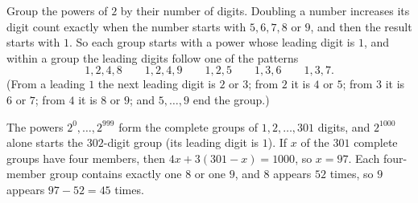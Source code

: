 Group the powers of $2$ by their number of digits. Doubling a number increases its digit count exactly when the number starts with $5,6,7,8$ or $9$, and then the result starts with $1$. So each group starts with a power whose leading digit is $1$, and within a group the leading digits follow one of the patterns
\[1,2,4,8\qquad1,2,4,9\qquad1,2,5\qquad1,3,6\qquad1,3,7.\]
(From a leading $1$ the next leading digit is $2$ or $3$; from $2$ it is $4$ or $5$; from $3$ it is $6$ or $7$; from $4$ it is $8$ or $9$; and $5,\dots,9$ end the group.)

The powers $2^0,\dots,2^{999}$ form the complete groups of $1,2,\dots,301$ digits, and $2^{1000}$ alone starts the $302$-digit group (its leading digit is $1$). If $x$ of the $301$ complete groups have four members, then $4x+3(301-x)=1000$, so $x=97$. Each four-member group contains exactly one $8$ or one $9$, and $8$ appears $52$ times, so $9$ appears $97-52=\boxed{45}$ times.
